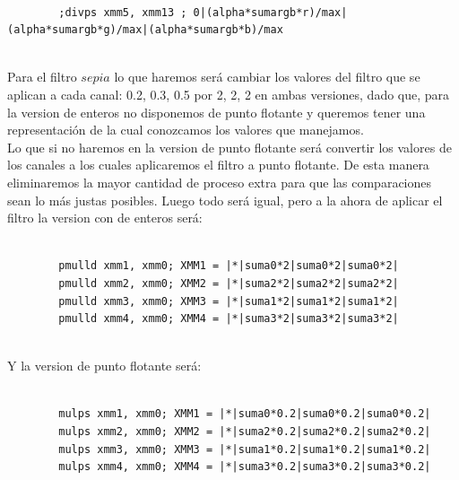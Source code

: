 \begin{codesnippet}
\begin{verbatim}
                
	    ;divps xmm5, xmm13 ; 0|(alpha*sumargb*r)/max|(alpha*sumargb*g)/max|(alpha*sumargb*b)/max    
                
\end{verbatim}
\end{codesnippet}

Para el filtro $sepia$ lo que haremos será cambiar los valores del filtro que se aplican a cada canal: 0.2, 0.3, 0.5 por 2, 2, 2 en ambas versiones, dado que, para la version de enteros no disponemos de punto flotante y queremos tener una representación de la cual conozcamos los valores que manejamos.\\
Lo que si no haremos en la version de punto flotante será convertir los valores de los canales a los cuales aplicaremos el filtro a punto flotante. De esta manera eliminaremos la mayor cantidad de proceso extra para que las comparaciones sean lo más justas posibles.  
Luego todo será igual, pero a la ahora de aplicar el filtro la version con de enteros será:\\

\begin{codesnippet}
\begin{verbatim}
                
		pmulld xmm1, xmm0; XMM1 = |*|suma0*2|suma0*2|suma0*2|  
		pmulld xmm2, xmm0; XMM2 = |*|suma2*2|suma2*2|suma2*2|  
		pmulld xmm3, xmm0; XMM3 = |*|suma1*2|suma1*2|suma1*2|   
		pmulld xmm4, xmm0; XMM4 = |*|suma3*2|suma3*2|suma3*2|   
                
\end{verbatim}
\end{codesnippet}

Y la version de punto flotante será:

\begin{codesnippet}
\begin{verbatim}

		mulps xmm1, xmm0; XMM1 = |*|suma0*0.2|suma0*0.2|suma0*0.2|  
		mulps xmm2, xmm0; XMM2 = |*|suma2*0.2|suma2*0.2|suma2*0.2|  
		mulps xmm3, xmm0; XMM3 = |*|suma1*0.2|suma1*0.2|suma1*0.2|  
		mulps xmm4, xmm0; XMM4 = |*|suma3*0.2|suma3*0.2|suma3*0.2|     

\end{verbatim}
\end{codesnippet}